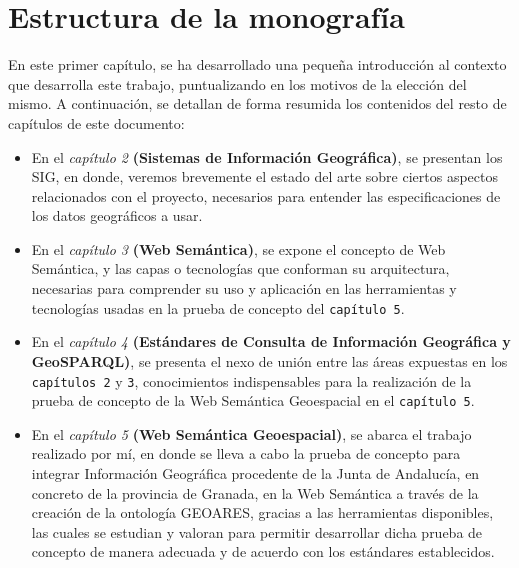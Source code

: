 \section{Estructura de la monografía}


En este primer capítulo, se ha desarrollado una pequeña introducción al contexto que desarrolla este trabajo, puntualizando en los motivos de la elección del mismo. A continuación, se detallan de forma resumida los contenidos del resto de capítulos de este documento:

\begin{itemize}
	\item En el \textit{capítulo 2} \textbf{(Sistemas de Información Geográfica)}, se presentan los SIG, en donde, veremos brevemente el estado del arte sobre ciertos aspectos relacionados con el proyecto, necesarios para entender las especificaciones de los datos geográficos a usar.
	
	\item En el \textit{capítulo 3} \textbf{(Web Semántica)}, se expone el concepto de Web Semántica, y las capas o tecnologías que conforman su arquitectura, necesarias para comprender su uso y aplicación en las herramientas y tecnologías usadas en la prueba de concepto del \texttt{capítulo 5}.
	
	\item En el \textit{capítulo 4} \textbf{(Estándares de Consulta de Información Geográfica y GeoSPARQL)}, se presenta el nexo de unión entre las áreas expuestas en los \texttt{capítulos 2} y \texttt{3}, conocimientos indispensables para la realización de la prueba de concepto de la Web Semántica Geoespacial en el \texttt{capítulo 5}.
	
	\item En el \textit{capítulo 5} \textbf{(Web Semántica Geoespacial)}, se abarca el trabajo realizado por mí, en donde se lleva a cabo la prueba de concepto para integrar Información Geográfica procedente de la Junta de Andalucía, en concreto de la provincia de Granada, en la Web Semántica a través de la creación de la ontología GEOARES, gracias a las herramientas disponibles, las cuales se estudian y valoran para permitir desarrollar dicha prueba de concepto de manera adecuada y de acuerdo con los estándares establecidos.
	
	

\end{itemize}
